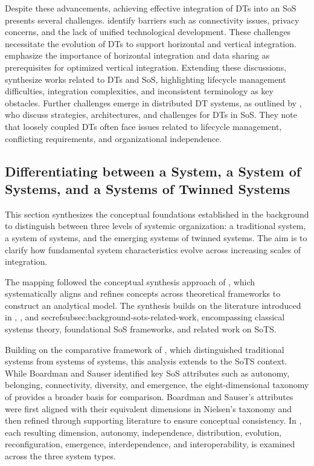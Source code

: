 Despite these advancements, achieving effective integration of DTs into an SoS presents several challenges. \citet{michael2022integration} identify barriers such as connectivity issues, privacy concerns, and the lack of unified technological development. These challenges necessitate the evolution of DTs to support horizontal and vertical integration. \citet{semeraro2021digital} emphasize the importance of horizontal integration and data sharing as prerequisites for optimized vertical integration. Extending these discussions, \citet{olsson2023systems} synthesize works related to DTs and SoS, highlighting lifecycle management difficulties, integration complexities, and inconsistent terminology as key obstacles. 
Further challenges emerge in distributed DT systems, as outlined by \citet{borth2019digital}, who discuss strategies, architectures, and challenges for DTs in SoS. They note that loosely coupled DTs often face issues related to lifecycle management, conflicting requirements, and organizational independence.


\subsection{Differentiating between a System, a System of Systems, and a Systems of Twinned Systems}
This section synthesizes the conceptual foundations established in the background to distinguish between three levels of systemic organization: a traditional system, a system of systems, and the emerging systems of twinned systems. The aim is to clarify how fundamental system characteristics evolve across increasing scales of integration.

The mapping followed the conceptual synthesis approach of \citet{jabareen2009building}, which systematically aligns and refines concepts across theoretical frameworks to construct an analytical model. The synthesis builds on the literature introduced in , , and 
secref{subsec:background-sots-related-work}, encompassing classical systems theory, foundational SoS frameworks, and related work on SoTS.

Building on the comparative framework of \citet{boardman2006system}, which distinguished traditional systems from systems of systems, this analysis extends to the SoTS context. While Boardman and Sauser identified key SoS attributes such as autonomy, belonging, connectivity, diversity, and emergence, the eight-dimensional taxonomy of \citet{nielsen2015systems} provides a broader basis for comparison. Boardman and Sauser’s attributes were first aligned with their equivalent dimensions in Nielsen’s taxonomy and then refined through supporting literature to ensure conceptual consistency. In , each resulting dimension, autonomy, independence, distribution, evolution, reconfiguration, emergence, interdependence, and interoperability, is examined across the three system types.

